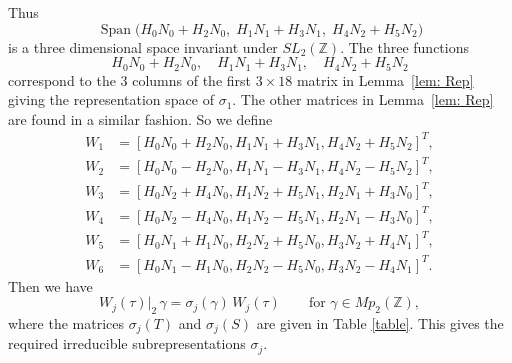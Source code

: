 \documentclass[11pt,reqno]{amsart}
\renewcommand{\=}{\;=\;}
\theoremstyle{myremark}
\begin{document}
Thus
\[
\operatorname{Span}\bigl( H_0 N_0 + H_2 N_0,\; H_1 N_1 + H_3 N_1,\; H_4 N_2 + H_5 N_2 \bigr)
\]
is a three dimensional space invariant under $SL_2(\mathbb{Z})$. 
The three functions
\[
H_0 N_0 + H_2 N_0,\quad H_1 N_1 + H_3 N_1,\quad H_4 N_2 + H_5 N_2
\]
correspond to the 3 columns of the first $3 \times 18$ matrix in Lemma~\ref{lem: Rep} giving the representation space of $\sigma_1$. 
The other matrices in Lemma~\ref{lem: Rep} are found in a similar fashion. 
So we define
\begin{align*}
W_1&=\left[H_{0} N_{0}+H_{2} N_{0}, 
H_{1} N_{1}+H_{3} N_{1}, 
H_{4} N_{2}+H_{5} N_{2}\right]^T, \\
W_2&=\left[H_{0} N_{0}-H_{2} N_{0}, 
H_{1} N_{1}-H_{3} N_{1}, 
H_{4} N_{2}-H_{5} N_{2}\right]^T, \\
W_3&=\left[H_{0} N_{2}+H_{4} N_{0}, 
H_{1} N_{2}+H_{5} N_{1}, 
H_{2} N_{1}+H_{3} N_{0}\right]^T,\\
W_4&=\left[H_{0} N_{2}-H_{4} N_{0}, 
H_{1} N_{2}-H_{5} N_{1}, 
H_{2} N_{1}-H_{3} N_{0}\right]^T,\\
W_5&=\left[H_{0} N_{1}+H_{1} N_{0}, 
H_{2} N_{2}+H_{5} N_{0}, 
H_{3} N_{2}+H_{4} N_{1}\right]^T,\\
W_6&=\left[H_{0} N_{1}-H_{1} N_{0}, 
H_{2} N_{2}-H_{5} N_{0}, 
H_{3} N_{2}-H_{4} N_{1}\right]^T.
\end{align*}
Then we have
\[
W_j(\tau)\big|_{2}\, \gamma = \sigma_j(\gamma)\, W_j(\tau) \qquad \text{for } \gamma \in Mp_2(\mathbb{Z}),
\]
where the matrices $\sigma_j(T)$ and $\sigma_j(S)$ are given in Table
\ref{table}.  
This gives the required irreducible subrepresentations $\sigma_j$.

\end{document}
